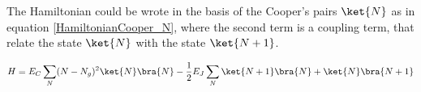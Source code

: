 The Hamiltonian could be wrote in the basis of the Cooper's pairs $\ket{N}$ as in equation \ref{HamiltonianCooper_N}, where the second term is a coupling term, that relate the state $\ket{N}$ with the state $\ket{N+1}$.

\begin{equation}
H = E_C \sum_N (N - N_g)^2 \ket{N}\bra{N} - \frac{1}{2} E_J \sum_N \ket{N+1}\bra{N} + \ket{N} \bra{N+1}
\label{HamiltonianCooper_N}
\end{equation}













